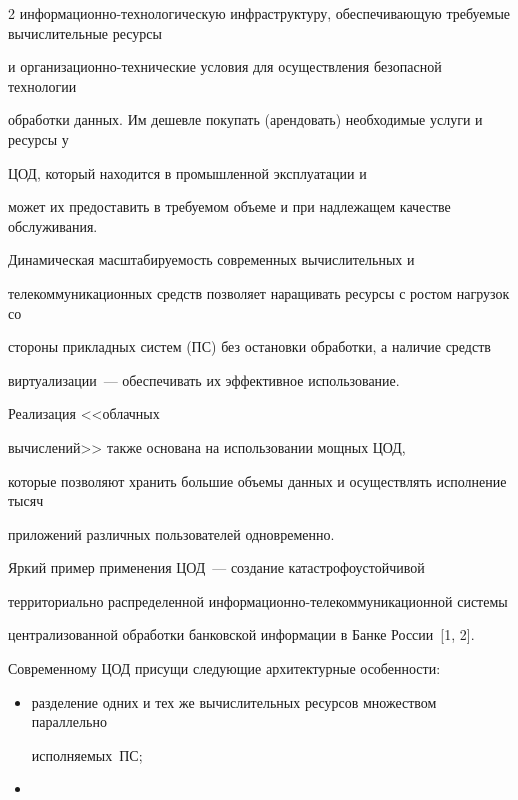 \begin{multicols}{2}
ин\-фор\-ма\-ци\-он\-но-технологическую инфраструктуру, обеспечи\-вающую требуемые вычислительные ресурсы 


и организационно-технические условия для осуществления безопасной технологии 


обработки данных. Им дешевле покупать (арендовать) необходимые услуги и ресурсы у 


ЦОД, который находится в промышленной эксплуатации и 


может их предоставить в требуемом объеме и при надлежащем качестве обслуживания.


       


       Динамическая масштабируемость современных вычислительных и 


телекоммуникационных средств позволяет наращивать ресурсы с ростом нагрузок со 


стороны прикладных сис\-тем (ПС) без остановки обработки, а наличие средств 


виртуализации~--- обеспечивать их эффективное использование. 





Реализация <<облачных 


вычислений>> также основана на использовании мощных ЦОД, 


которые позволяют хранить большие объемы данных и осуществлять исполнение тысяч 


приложений различных пользователей одновременно. 


       


       Яркий пример применения ЦОД~--- создание катастрофоустойчивой 


территориально распределенной информационно-телекоммуникационной сис\-те\-мы 


централизованной обработки банковской информа\-ции в Банке России~[1, 2]. 


       


       Современному ЦОД присущи следующие архитектурные особенности:


       \begin{itemize}


        \item  разделение одних и тех же вычислительных ресурсов множеством параллельно 


исполня\-емых~ПС;


       \item 



\end{itemize}
\end{multicols}
